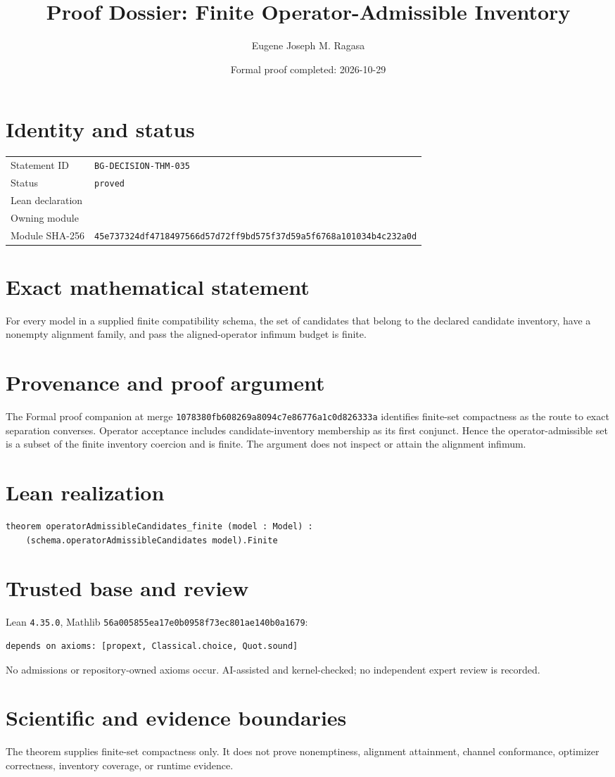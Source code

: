 \documentclass[11pt]{article}
\title{Proof Dossier: Finite Operator-Admissible Inventory}
\author{Eugene Joseph M. Ragasa}
\date{Formal proof completed: 2026-10-29}
\begin{document}
\maketitle
\section{Identity and status}
\begin{tabularx}{\textwidth}{@{}lY@{}}\toprule
Statement ID & \texttt{BG-DECISION-THM-035} \\
Status & \texttt{proved} \\
Lean declaration &  \\
Owning module &  \\
Module SHA-256 & \texttt{45e737324df4718497566d57d72ff9bd575f37d59a5f6768a101034b4c232a0d} \\
\bottomrule\end{tabularx}
\section{Exact mathematical statement}
For every model in a supplied finite compatibility schema, the set of candidates that
belong to the declared candidate inventory, have a nonempty alignment family, and pass
the aligned-operator infimum budget is finite.
\section{Provenance and proof argument}
The Formal proof companion at merge
\texttt{1078380fb608269a8094c7e86776a1c0d826333a} identifies finite-set compactness as the
route to exact separation converses. Operator acceptance includes candidate-inventory
membership as its first conjunct. Hence the operator-admissible set is a subset of the
finite inventory coercion and is finite. The argument does not inspect or attain the
alignment infimum.
\section{Lean realization}
\begin{lstlisting}
theorem operatorAdmissibleCandidates_finite (model : Model) :
    (schema.operatorAdmissibleCandidates model).Finite
\end{lstlisting}
\section{Trusted base and review}
Lean \texttt{4.35.0}, Mathlib
\texttt{56a005855ea17e0b0958f73ec801ae140b0a1679}:
\begin{lstlisting}
depends on axioms: [propext, Classical.choice, Quot.sound]
\end{lstlisting}
No admissions or repository-owned axioms occur. AI-assisted and kernel-checked; no
independent expert review is recorded.
\section{Scientific and evidence boundaries}
The theorem supplies finite-set compactness only. It does not prove nonemptiness,
alignment attainment, channel conformance, optimizer correctness, inventory coverage,
or runtime evidence.
\end{document}
